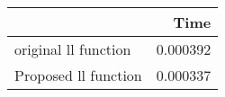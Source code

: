 \begin{tabular}{lr}
\toprule
{} &      Time \\
\midrule
original ll function &  0.000392 \\
Proposed ll function &  0.000337 \\
\bottomrule
\end{tabular}
